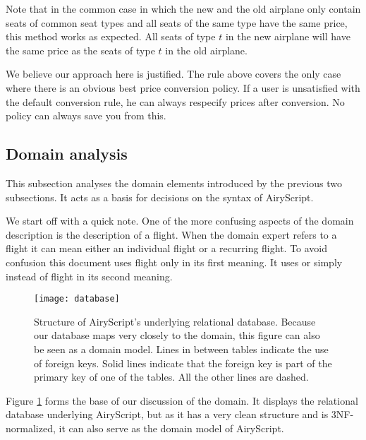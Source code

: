 \begin{itemize}
    Note that in the common case in which the new and the old airplane only
    contain seats of common seat types and all seats of the same type have the
    same price, this method works as expected. All seats of type $t$ in the new
    airplane will have the same price as the seats of type $t$ in the old
    airplane.

    We believe our approach here is justified. The rule above covers the only
    case where there is an obvious best price conversion policy. If a user is
    unsatisfied with the default conversion rule, he can always respecify prices
    after conversion. No policy can always save you from this.
\end{itemize}


\subsection{Domain analysis}
\label{sec:domain_analysis}
This subsection analyses the domain elements introduced by the previous two
subsections. It acts as a basis for decisions on the syntax of AiryScript.

We start off with a quick note. One of the more confusing aspects of the domain
description is the description of a flight. When the domain expert refers to a
flight it can mean either an individual flight or a recurring flight. To avoid
confusion this document uses flight only in its first meaning. It uses
 or simply  instead of flight in its second
meaning.

\begin{figure}
  \def\svgwidth{\textwidth}
  \texttt{[image: database]}
  \caption{Structure of AiryScript’s underlying relational database. Because our
  database maps very closely to the domain, this figure can also be seen as a
domain model.
Lines in between tables indicate the use of foreign keys. Solid lines indicate
that the foreign key is part of the primary key of one of the tables. All the
other lines are dashed.}
  \label{fig:database}
\end{figure}

Figure \ref{fig:database} forms the base of our discussion of the domain. It
displays the relational database underlying AiryScript, but as it has a very
clean structure and is 3NF-normalized, it can also serve as the domain model of
AiryScript.

